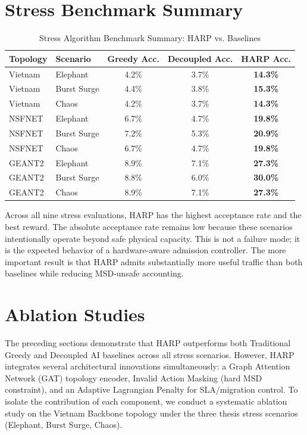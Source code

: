 \documentclass[12pt, a4paper, reqno, oneside]{book}
\begin{document}
\section{Stress Benchmark Summary}

\begin{table}[H]
\centering
\caption{Stress Algorithm Benchmark Summary: HARP vs. Baselines}
\label{table:algorithm_stress_summary}
\renewcommand{\arraystretch}{1.15}
\small
\begin{tabular}{llccc}
\toprule
\textbf{Topology} & \textbf{Scenario} & \textbf{Greedy Acc.} & \textbf{Decoupled Acc.} & \textbf{HARP Acc.} \\
\midrule
Vietnam & Elephant & 4.2\% & 3.7\% & \textbf{14.3\%} \\
Vietnam & Burst Surge & 4.4\% & 3.8\% & \textbf{15.3\%} \\
Vietnam & Chaos & 4.2\% & 3.7\% & \textbf{14.3\%} \\
NSFNET & Elephant & 6.7\% & 4.7\% & \textbf{19.8\%} \\
NSFNET & Burst Surge & 7.2\% & 5.3\% & \textbf{20.9\%} \\
NSFNET & Chaos & 6.7\% & 4.7\% & \textbf{19.8\%} \\
GEANT2 & Elephant & 8.9\% & 7.1\% & \textbf{27.3\%} \\
GEANT2 & Burst Surge & 8.8\% & 6.0\% & \textbf{30.0\%} \\
GEANT2 & Chaos & 8.9\% & 7.1\% & \textbf{27.3\%} \\
\bottomrule
\end{tabular}
\end{table}

Across all nine stress evaluations, HARP has the highest acceptance rate and the best reward. The absolute acceptance rate remains low because these scenarios intentionally operate beyond safe physical capacity. This is not a failure mode; it is the expected behavior of a hardware-aware admission controller. The more important result is that HARP admits substantially more useful traffic than both baselines while reducing MSD-unsafe accounting.

\section{Ablation Studies}
\label{sec:ablation}

The preceding sections demonstrate that HARP outperforms both Traditional Greedy and Decoupled AI baselines across all stress scenarios. However, HARP integrates several architectural innovations simultaneously: a Graph Attention Network (GAT) topology encoder, Invalid Action Masking (hard MSD constraint), and an Adaptive Lagrangian Penalty for SLA/migration control. To isolate the contribution of each component, we conduct a systematic ablation study on the Vietnam Backbone topology under the three thesis stress scenarios (Elephant, Burst Surge, Chaos).
\end{document}
